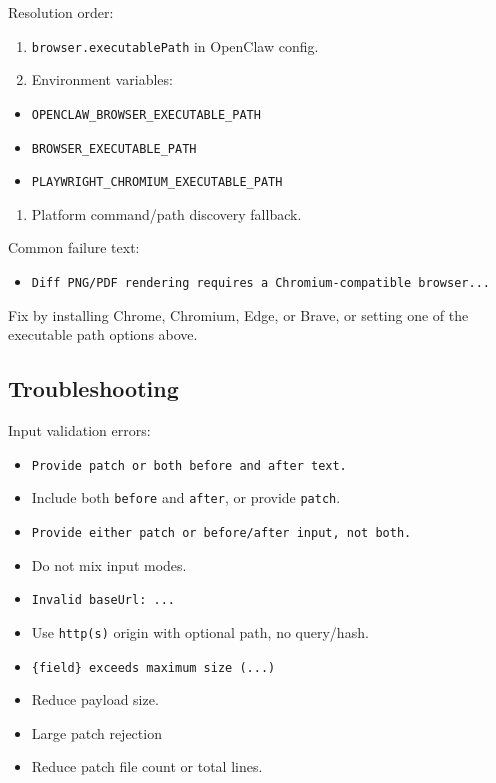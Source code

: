 Resolution order:

\begin{enumerate}
  \item \texttt{browser.executablePath} in OpenClaw config.
  \item Environment variables:
\end{enumerate}

\begin{itemize}
  \item \texttt{OPENCLAW\_BROWSER\_EXECUTABLE\_PATH}
  \item \texttt{BROWSER\_EXECUTABLE\_PATH}
  \item \texttt{PLAYWRIGHT\_CHROMIUM\_EXECUTABLE\_PATH}
\end{itemize}

\begin{enumerate}
  \item Platform command/path discovery fallback.
\end{enumerate}


Common failure text:

\begin{itemize}
  \item \texttt{Diff PNG/PDF rendering requires a Chromium-compatible browser...}
\end{itemize}


Fix by installing Chrome, Chromium, Edge, or Brave, or setting one of the executable path options above.

\subsection{Troubleshooting}


Input validation errors:

\begin{itemize}
  \item \texttt{Provide patch or both before and after text.}
  \item Include both \texttt{before} and \texttt{after}, or provide \texttt{patch}.
  \item \texttt{Provide either patch or before/after input, not both.}
  \item Do not mix input modes.
  \item \texttt{Invalid baseUrl: ...}
  \item Use \texttt{http(s)} origin with optional path, no query/hash.
  \item \texttt{\{field\} exceeds maximum size (...)}
  \item Reduce payload size.
  \item Large patch rejection
  \item Reduce patch file count or total lines.
\end{itemize}


